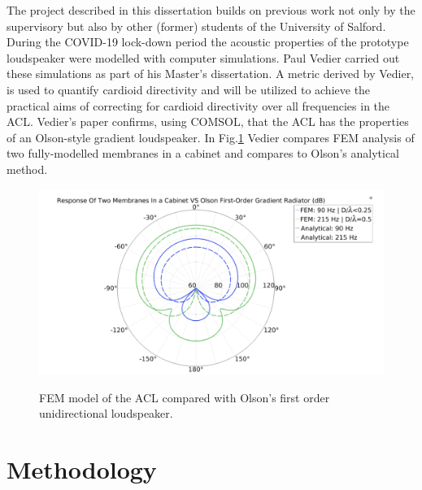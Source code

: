 \documentclass{report}
\begin{document}
        The project described in this dissertation builds on previous work not only by the supervisory but also by other (former) students of the University of Salford.
        During the COVID-19 lock-down period the acoustic properties of the prototype loudspeaker were modelled with computer simulations.
        Paul Vedier carried out these simulations as part of his Master's dissertation.
        A metric derived by Vedier, is used to quantify cardioid directivity and will be utilized to achieve the practical aims of correcting for cardioid directivity over all frequencies in the ACL.
        Vedier's paper confirms, using COMSOL, that the ACL has the properties of an Olson-style gradient loudspeaker.
        In Fig.\ref{vedierPolar} Vedier compares FEM analysis of two fully-modelled membranes in a cabinet and compares to Olson's analytical method.
        \begin{figure}[H]
            \centering
            \includegraphics[scale=0.5]{figs/vedierPolar.png}
            \caption{FEM model of the ACL compared with Olson's first order unidirectional loudspeaker.}\cite{vedier}
            \label{vedierPolar}
        \end{figure}

\chapter{Methodology}
\end{document}
